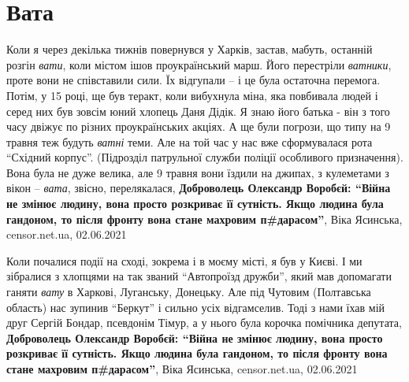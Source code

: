  
 
 
 
 
\chapter{Вата}

Коли я через декілька тижнів повернувся у Харків, застав, мабуть, останній
розгін \emph{вати}, коли містом ішов проукраїнський марш. Його перестріли \emph{ватники},
проте вони не співставили сили. Їх відгупали – і це була остаточна перемога.
Потім, у 15 році, ще був теракт, коли вибухнула міна, яка повбивала людей і
серед них був зовсім юний хлопець Даня Дідік. Я знаю його батька - він з того
часу двіжує по різних проукраїнських акціях. А ще були погрози, що типу на 9
травня теж будуть \emph{ватні} теми. Але на той час у нас вже сформувалася рота
\enquote{Східний корпус}. (Підрозділ патрульної служби поліції особливого призначення).
Вона була не дуже велика, але 9 травня вони їздили на джипах, з кулеметами з
вікон – \emph{вата}, звісно, перелякалася, 
\textbf{Доброволець Олександр Воробєй: \enquote{Війна не змінює людину, вона
просто розкриває її сутність. Якщо людина була гандоном, то після фронту вона
стане махровим п\#дарасом}},
Віка Ясинська, censor.net.ua, 02.06.2021

Коли почалися події на сході, зокрема і в моєму місті, я був у Києві. І ми
зібралися з хлопцями на так званий \enquote{Автопроїзд дружби}, який мав допомагати
ганяти \emph{вату} в Харкові, Луганську, Донецьку. Але під Чутовим (Полтавська
область) нас зупинив \enquote{Беркут} і сильно усіх відгамселив. Тоді з нами їхав мій
друг Сергій Бондар, псевдонім Тімур, а у нього була корочка помічника депутата,
\textbf{Доброволець Олександр Воробєй: \enquote{Війна не змінює людину, вона
просто розкриває її сутність. Якщо людина була гандоном, то після фронту вона
стане махровим п\#дарасом}},
Віка Ясинська, censor.net.ua, 02.06.2021

